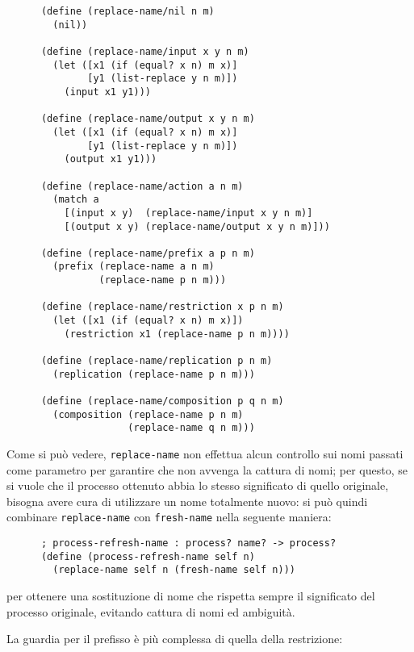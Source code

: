 \begin{lstlisting}
      (define (replace-name/nil n m)
        (nil))

      (define (replace-name/input x y n m)
        (let ([x1 (if (equal? x n) m x)]
              [y1 (list-replace y n m)])
          (input x1 y1)))

      (define (replace-name/output x y n m)
        (let ([x1 (if (equal? x n) m x)]
              [y1 (list-replace y n m)])
          (output x1 y1)))

      (define (replace-name/action a n m)
        (match a
          [(input x y)  (replace-name/input x y n m)]
          [(output x y) (replace-name/output x y n m)]))

      (define (replace-name/prefix a p n m)
        (prefix (replace-name a n m)
                (replace-name p n m)))

      (define (replace-name/restriction x p n m)
        (let ([x1 (if (equal? x n) m x)])
          (restriction x1 (replace-name p n m))))

      (define (replace-name/replication p n m)
        (replication (replace-name p n m)))

      (define (replace-name/composition p q n m)
        (composition (replace-name p n m)
                     (replace-name q n m)))
\end{lstlisting}

Come si pu\`o vedere, \lstinline{replace-name} non effettua alcun
controllo sui nomi passati come parametro per garantire che non avvenga
la cattura di nomi; per questo, se si vuole che il processo ottenuto
abbia lo stesso significato di quello originale, bisogna avere cura di
utilizzare un nome totalmente nuovo: si pu\`o quindi combinare
\lstinline{replace-name} con \lstinline{fresh-name} nella seguente
maniera:

\begin{lstlisting}
      ; process-refresh-name : process? name? -> process?
      (define (process-refresh-name self n)
        (replace-name self n (fresh-name self n)))
\end{lstlisting}

per ottenere una sostituzione di nome che rispetta sempre il significato
del processo originale, evitando cattura di nomi ed ambiguit\`a.

La guardia per il prefisso \`e pi\`u complessa di quella della
restrizione:

